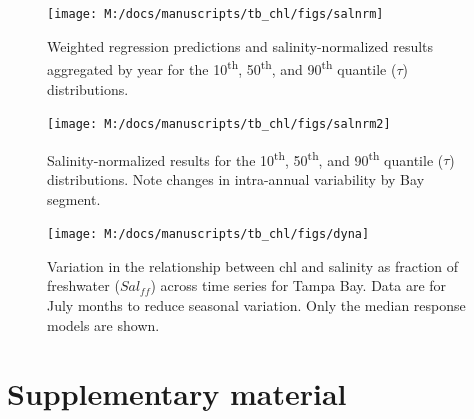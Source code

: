 \documentclass{svjour3}\usepackage[]{graphicx}\usepackage[]{color}
\begin{document}
\begin{figure}[!ht]


{\centering \texttt{[image: M:/docs/manuscripts/tb\_chl/figs/salnrm]} 

}

\caption[Weighted regression predictions and salinity-normalized results aggregated by year for  the 10\textsuperscript{th}, 50\textsuperscript{th}, and 90\textsuperscript{th} quantile ($\tau$) distributions]{Weighted regression predictions and salinity-normalized results aggregated by year for  the 10\textsuperscript{th}, 50\textsuperscript{th}, and 90\textsuperscript{th} quantile ($\tau$) distributions.\label{fig:salnrm}}
\end{figure}



\begin{figure}[!ht]


{\centering \texttt{[image: M:/docs/manuscripts/tb\_chl/figs/salnrm2]} 

}

\caption[Salinity-normalized results for the 10\textsuperscript{th}, 50\textsuperscript{th}, and 90\textsuperscript{th} quantile ($\tau$) distributions]{Salinity-normalized results for the 10\textsuperscript{th}, 50\textsuperscript{th}, and 90\textsuperscript{th} quantile ($\tau$) distributions. Note changes in intra-annual variability by Bay segment.\label{fig:salnrm2}}
\end{figure}



\begin{figure}[!ht]


{\centering \texttt{[image: M:/docs/manuscripts/tb\_chl/figs/dyna]} 

}

\caption[Variation in the relationship between \ac{chl} and salinity as fraction of freshwater ($Sal_{ff}$) across time series for Tampa Bay]{Variation in the relationship between \ac{chl} and salinity as fraction of freshwater ($Sal_{ff}$) across time series for Tampa Bay. Data are for July months to reduce seasonal variation. Only the median response models are shown.\label{fig:dyna}}
\end{figure}



\clearpage
\section{Supplementary material}
\end{document}
